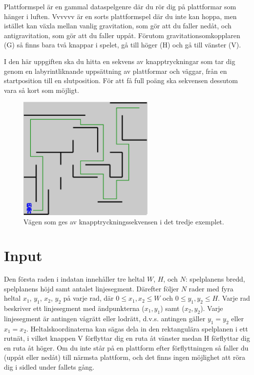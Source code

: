 
Plattformspel är en gammal dataspelgenre där du rör dig på plattformar som hänger i luften. Vvvvvv är en sorts plattformspel där du inte kan hoppa, men istället kan växla mellan vanlig gravitation, som gör att du faller nedåt, och antigravitation, som gör att du faller uppåt. Förutom gravitationsomkopplaren (G) så finns bara två knappar i spelet, gå till höger (H) och gå till vänster (V).

I den här uppgiften ska du hitta en sekvens av knapptryckningar som tar dig genom en labyrintliknande uppsättning av plattformar och väggar, från en startposition till en slutposition. För att få full poäng ska sekvensen dessutom vara så kort som möjligt.

\begin{figure}[ht!]
\centering
\includegraphics[width=0.6\textwidth]{spelplan.pdf}
\caption{Vägen som ges av knapptryckningssekvensen i det tredje exemplet.}
\label{overflow}
\end{figure}


\section*{Input}

Den första raden i indatan innehåller tre heltal $W$, $H$, och $N$: spelplanens bredd, spelplanens höjd samt antalet linjesegment. Därefter följer $N$ rader med fyra heltal $x_1$, $y_1$, $x_2$, $y_2$ på varje rad, där $0 \le x_1,x_2 \le W$ och $0 \le y_1,y_2 \le H$. Varje rad beskriver ett linjesegment med ändpunkterna ($x_1, y_1$) samt ($x_2, y_2$). Varje linjesegment är antingen vågrätt eller lodrätt, d.v.s. antingen gäller $y_1=y_2$ eller $x_1=x_2$. Heltalskoordinaterna kan sägas dela in den rektangulära spelplanen i ett rutnät, i vilket knappen V förflyttar dig en ruta åt vänster medan H förflyttar dig en ruta åt höger. Om du inte står på en plattform efter förflyttningen så faller du (uppåt eller nedåt) till närmsta plattform, och det finns ingen möjlighet att röra dig i sidled under fallets gång.

